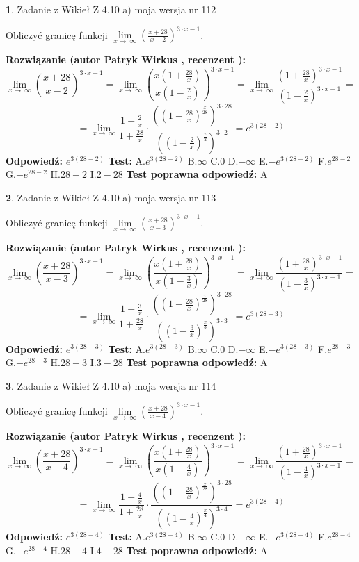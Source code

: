 \documentclass[12pt, a4paper]{article}
\theoremstyle{definition} %
\newtheorem{zad}{}
\newcommand{\zadStart}[1]{\begin{zad}#1\newline}
\newcommand{\zadStop}{\end{zad}}
\newcommand{\rozwStart}[2]{\noindent \textbf{Rozwiązanie (autor #1 , recenzent #2): }\newline}
\newcommand{\rozwStop}{\newline}
\newcommand{\odpStart}{\noindent \textbf{Odpowiedź:}\newline}
\newcommand{\odpStop}{\newline}
\newcommand{\testStart}{\noindent \textbf{Test:}\newline}
\newcommand{\testStop}{\newline}
\newcommand{\kluczStart}{\noindent \textbf{Test poprawna odpowiedź:}\newline}
\newcommand{\kluczStop}{\newline}
\begin{document}
\zadStart{Zadanie z Wikieł Z 4.10 a) moja wersja nr 112}


Obliczyć granicę funkcji  $\lim\limits_{x\to\ \infty}(\frac{x+28}{x-2})^{3\cdot x-1}$.
\zadStop
\rozwStart{Patryk Wirkus}{}
$$\lim\limits_{x\to\ \infty}(\frac{x+28}{x-2})^{3\cdot x-1} = \lim\limits_{x\to\ \infty}(\frac{x(1+\frac{28}{x})}{x(1-\frac{2}{x})})^{3\cdot x-1}=\lim\limits_{x\to\ \infty}\frac{(1+\frac{28}{x})^{3\cdot x-1}}{(1-\frac{2}{x})^{3\cdot x-1}}=$$
$$=\lim\limits_{x\to\ \infty}\frac{1-\frac{2}{x}}{1+\frac{28}{x}}\cdot\frac{((1+\frac{28}{x})^{\frac{x}{28}})^{3\cdot28}}{((1-\frac{2}{x})^{\frac{x}{2}})^{3\cdot2}}=e^{3(28-2)}$$
\rozwStop
\odpStart
$e^{3(28-2)}$
\odpStop
\testStart
A.$e^{3(28-2)}$ B.$\infty$ C.$0$ D.$-\infty$ E.$-e^{3(28-2)}$
F.$e^{28-2}$ G.$-e^{28-2}$
H.$28-2$
I.$2-28$
\testStop
\kluczStart
A
\kluczStop



\zadStart{Zadanie z Wikieł Z 4.10 a) moja wersja nr 113}


Obliczyć granicę funkcji  $\lim\limits_{x\to\ \infty}(\frac{x+28}{x-3})^{3\cdot x-1}$.
\zadStop
\rozwStart{Patryk Wirkus}{}
$$\lim\limits_{x\to\ \infty}(\frac{x+28}{x-3})^{3\cdot x-1} = \lim\limits_{x\to\ \infty}(\frac{x(1+\frac{28}{x})}{x(1-\frac{3}{x})})^{3\cdot x-1}=\lim\limits_{x\to\ \infty}\frac{(1+\frac{28}{x})^{3\cdot x-1}}{(1-\frac{3}{x})^{3\cdot x-1}}=$$
$$=\lim\limits_{x\to\ \infty}\frac{1-\frac{3}{x}}{1+\frac{28}{x}}\cdot\frac{((1+\frac{28}{x})^{\frac{x}{28}})^{3\cdot28}}{((1-\frac{3}{x})^{\frac{x}{3}})^{3\cdot3}}=e^{3(28-3)}$$
\rozwStop
\odpStart
$e^{3(28-3)}$
\odpStop
\testStart
A.$e^{3(28-3)}$ B.$\infty$ C.$0$ D.$-\infty$ E.$-e^{3(28-3)}$
F.$e^{28-3}$ G.$-e^{28-3}$
H.$28-3$
I.$3-28$
\testStop
\kluczStart
A
\kluczStop



\zadStart{Zadanie z Wikieł Z 4.10 a) moja wersja nr 114}


Obliczyć granicę funkcji  $\lim\limits_{x\to\ \infty}(\frac{x+28}{x-4})^{3\cdot x-1}$.
\zadStop
\rozwStart{Patryk Wirkus}{}
$$\lim\limits_{x\to\ \infty}(\frac{x+28}{x-4})^{3\cdot x-1} = \lim\limits_{x\to\ \infty}(\frac{x(1+\frac{28}{x})}{x(1-\frac{4}{x})})^{3\cdot x-1}=\lim\limits_{x\to\ \infty}\frac{(1+\frac{28}{x})^{3\cdot x-1}}{(1-\frac{4}{x})^{3\cdot x-1}}=$$
$$=\lim\limits_{x\to\ \infty}\frac{1-\frac{4}{x}}{1+\frac{28}{x}}\cdot\frac{((1+\frac{28}{x})^{\frac{x}{28}})^{3\cdot28}}{((1-\frac{4}{x})^{\frac{x}{4}})^{3\cdot4}}=e^{3(28-4)}$$
\rozwStop
\odpStart
$e^{3(28-4)}$
\odpStop
\testStart
A.$e^{3(28-4)}$ B.$\infty$ C.$0$ D.$-\infty$ E.$-e^{3(28-4)}$
F.$e^{28-4}$ G.$-e^{28-4}$
H.$28-4$
I.$4-28$
\testStop
\kluczStart
A
\kluczStop
\end{document}

